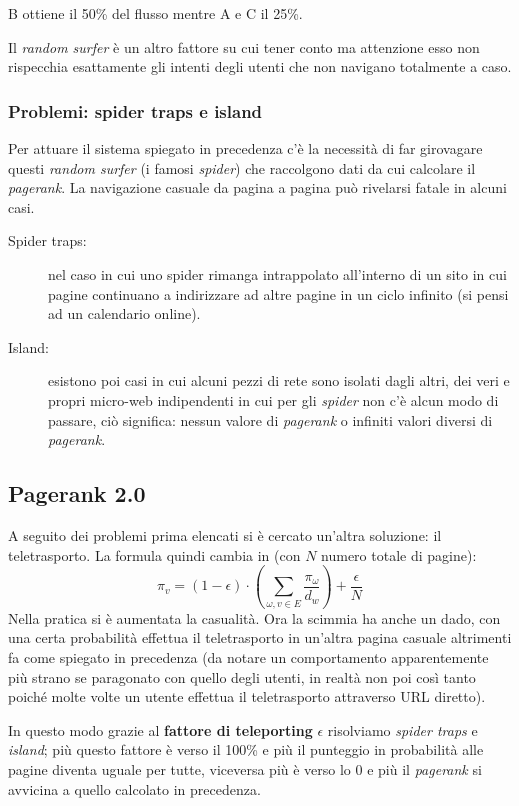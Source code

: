 					B ottiene il 50\% del flusso mentre A e C il 25\%.
					
				Il \emph{random surfer} è un altro fattore su cui tener conto ma attenzione esso non rispecchia esattamente gli intenti degli utenti che non navigano totalmente a caso.
			
			\subsubsection{Problemi: spider traps e island}
				Per attuare il sistema spiegato in precedenza c'è la necessità di far girovagare questi \emph{random surfer} (i famosi \emph{spider}) che raccolgono dati da cui calcolare il \emph{pagerank}. La navigazione casuale da pagina a pagina può rivelarsi fatale in alcuni casi.
				\begin{description}
					\item[Spider traps:] nel caso in cui uno spider rimanga intrappolato all'interno di un sito in cui pagine continuano a indirizzare ad altre pagine in un ciclo infinito (si pensi ad un calendario online).
					\item[Island:] esistono poi casi in cui alcuni pezzi di rete sono isolati dagli altri, dei veri e propri micro-web indipendenti in cui per gli \emph{spider} non c'è alcun modo di passare, ciò significa: nessun valore di \emph{pagerank} o infiniti valori diversi di \emph{pagerank}.
				\end{description}
				
		\subsection{Pagerank 2.0}
			A seguito dei problemi prima elencati si è cercato un'altra soluzione: il teletrasporto. La formula quindi cambia in (con $N$ numero totale di pagine):
			\[
				\pi_v=(1-\epsilon)\cdot \left( \sum_{\omega, v \in E} \frac{\pi_{\omega}}{d_w} \right) + \frac{\epsilon}{N}
			\]
			Nella pratica si è aumentata la casualità. Ora la scimmia ha anche un dado,  con una certa probabilità effettua il teletrasporto in un'altra pagina casuale altrimenti fa come spiegato in precedenza (da notare un comportamento apparentemente più strano se paragonato con quello degli utenti, in realtà non poi così tanto poiché molte volte un utente effettua il teletrasporto attraverso URL diretto).
			
			In questo modo grazie al \textbf{fattore di teleporting} $\epsilon$ risolviamo \emph{spider traps} e \emph{island}; più questo fattore è verso il 100\% e più il punteggio in probabilità alle pagine diventa uguale per tutte, viceversa più è verso lo 0 e più il \emph{pagerank} si avvicina a quello calcolato in precedenza.
			
